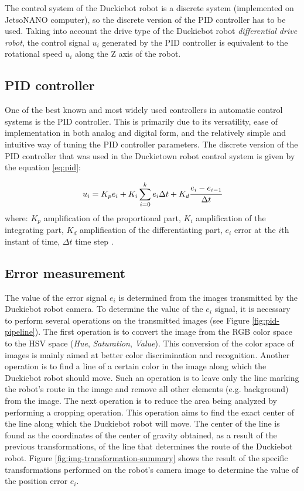 \documentclass[conference]{IEEEtran}
\begin{document}
The control system of the Duckiebot robot is a discrete system (implemented on JetsoNANO computer), so the discrete version of the PID controller has to be used. Taking into account the drive type of the Duckiebot robot \emph{differential drive robot}, the control signal $u_i$ generated by the PID controller is equivalent to the rotational speed $u_i$ along the Z axis of the robot.

\subsection{PID controller}
One of the best known and most widely used controllers in automatic control systems is the PID controller. This is primarily due to its versatility, ease of implementation in both analog and digital form, and the relatively simple and intuitive way of tuning the PID controller parameters. The discrete version of the PID controller that was used in the Duckietown robot control system is given by the equation \eqref{eq:pid}:

\begin{equation}
u_i = K_p e_i + K_i \sum_{i=0}^k{e_i \Delta t} + K_d \cfrac{e_i-e_{i-1}}{\Delta t}
\label{eq:pid}
\end{equation}
where: $K_p$ amplification of the proportional part, $K_i$ amplification of the integrating part, $K_d$ amplification of the differentiating part, $e_i$ error at the $i$th instant of time, $\Delta t$ time step \cite{aastrom2021feedback}.

\subsection{Error measurement}
The value of the error signal $e_i$ is determined from the images transmitted by the Duckiebot robot camera. To determine the value of the $e_i$ signal, it is necessary to perform several operations on the transmitted images (see Figure \ref{fig:pid-pipeline}). 
The first operation is to convert the image from the RGB color space to the HSV space (\emph{Hue}, \emph{Saturation}, \emph{Value}). This conversion of the color space of images is mainly aimed at better color discrimination and recognition. 
Another operation is to find a line of a certain color in the image along which the Duckiebot robot should move. Such an operation is to leave only the line marking the robot's route in the image and remove all other elements (e.g. background) from the image. 
The next operation is to reduce the area being analyzed by performing a cropping operation. This operation aims to find the exact center of the line along which the Duckiebot robot will move. 
The center of the line is found as the coordinates of the center of gravity obtained, as a result of the previous transformations, of the line that determines the route of the Duckiebot robot. Figure \ref{fig:img-transformation-summary} shows the result of the specific transformations performed on the robot's camera image to determine the value of the position error $e_i$.
\end{document}
